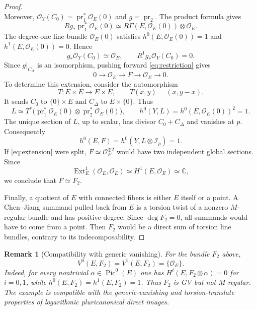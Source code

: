 \documentclass[10pt,a4paper]{amsart}
\newtheorem{remark}[theorem]{Remark}
\newcommand{\OO}{\mathcal O}
\newcommand{\II}{\mathcal I}
\newcommand{\CC}{\mathbb C}
\DeclareMathOperator{\Pic}{Pic}
\DeclareMathOperator{\pr}{pr}
\DeclareMathOperator{\Ext}{Ext}
\begin{document}
\begin{proof}
\[\]
Moreover, $\OO_Y(C_0)=\pr_1^*\OO_E(0)$ and $g=\pr_2$. The product formula gives
\[
Rg_*\pr_1^*\OO_E(0)\simeq R\Gamma(E,\OO_E(0))\otimes\OO_E.
\]
The degree-one line bundle $\OO_E(0)$ satisfies $h^0(E,\OO_E(0))=1$ and $h^1(E,\OO_E(0))=0$. Hence
\begin{equation}\label{eq:product}
g_*\OO_Y(C_0)\simeq\OO_E,\qquad R^1g_*\OO_Y(C_0)=0.
\end{equation}
Since $g|_{C_\Delta}$ is an isomorphism, pushing forward \eqref{eq:restriction} gives
\begin{equation}\label{eq:extension}
0\longrightarrow\OO_E\longrightarrow F\longrightarrow\OO_E\longrightarrow0.
\end{equation}
To determine this extension, consider the automorphism
\[
T:E\times E\longrightarrow E\times E,\qquad T(x,y)=(x,y-x).
\]
It sends $C_0$ to $\{0\}\times E$ and $C_\Delta$ to $E\times\{0\}$. Thus
\[
L\simeq T^*\bigl(\pr_1^*\OO_E(0)\otimes\pr_2^*\OO_E(0)\bigr),
\qquad h^0(Y,L)=h^0(E,\OO_E(0))^2=1.
\]
The unique section of $L$, up to scalar, has divisor $C_0+C_\Delta$ and vanishes at $p$. Consequently
\[
h^0(E,F)=h^0(Y,L\otimes\II_p)=1.
\]
If \eqref{eq:extension} were split, $F\simeq\OO_E^{\oplus2}$ would have two independent global sections. Since
\[
\Ext^1_E(\OO_E,\OO_E)\simeq H^1(E,\OO_E)\simeq\CC,
\]
we conclude that $F\simeq F_2$.

Finally, a quotient of $E$ with connected fibers is either $E$ itself or a point. A Chen--Jiang summand pulled back from $E$ is a torsion twist of a nonzero $M$-regular bundle and has positive degree. Since $\deg F_2=0$, all summands would have to come from a point. Then $F_2$ would be a direct sum of torsion line bundles, contrary to its indecomposability.
\end{proof}

\begin{remark}[Compatibility with generic vanishing]\label{rem:F2loci}
For the bundle $F_2$ above,
\[
V^0(E,F_2)=V^1(E,F_2)=\{\OO_E\}.
\]
Indeed, for every nontrivial $\alpha\in\Pic^0(E)$ one has $H^i(E,F_2\otimes\alpha)=0$ for $i=0,1$, while $h^0(E,F_2)=h^1(E,F_2)=1$. Thus $F_2$ is GV but not $M$-regular. The example is compatible with the generic-vanishing and torsion-translate properties of logarithmic pluricanonical direct images.
\end{remark}
\end{document}
